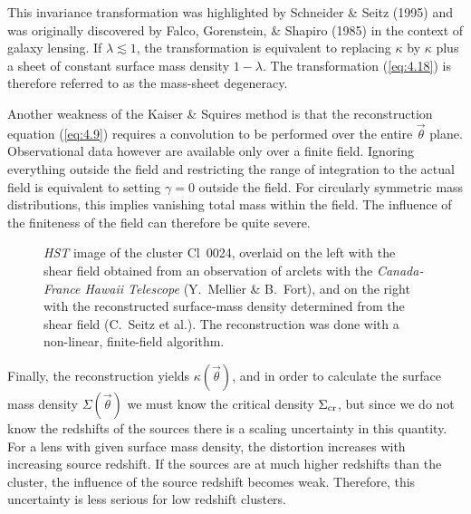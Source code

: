 \documentclass[a4paper,10pt]{article} %
\newcommand{\la}{\lesssim}
\begin{document}
This invariance transformation was highlighted by Schneider \& Seitz
(1995) and was originally discovered by Falco, Gorenstein, \& Shapiro
(1985) in the context of galaxy lensing. If $\lambda\la1$, the
transformation is equivalent to replacing $\kappa$ by $\kappa$ plus a
sheet of constant surface mass density $1-\lambda$. The transformation
(\ref{eq:4.18}) is therefore referred to as the mass-sheet degeneracy.

Another weakness of the Kaiser \& Squires method is that the
reconstruction equation (\ref{eq:4.9}) requires a convolution to be
performed over the entire $\vec\theta$ plane. Observational data
however are available only over a finite field. Ignoring everything
outside the field and restricting the range of integration to the
actual field is equivalent to setting $\gamma=0$ outside the
field. For circularly symmetric mass distributions, this implies
vanishing total mass within the field. The influence of the finiteness
of the field can therefore be quite severe.

\begin{figure}[ht] %
\begin{center}
\begin{minipage}[t]{0.45\hsize}
\end{minipage}
\begin{minipage}[t]{0.45\hsize}
\end{minipage}
\end{center}
\caption{{\em HST\/} image of the cluster Cl~0024, overlaid on the
  left with the shear field obtained from an observation of arclets
  with the {\em Canada-France Hawaii Telescope\/} (Y.\ Mellier \& B.\
  Fort), and on the right with the reconstructed surface-mass density
  determined from the shear field (C.\ Seitz et al.). The
  reconstruction was done with a non-linear, finite-field algorithm.}
\label{NB:fig4.3}
\end{figure}

Finally, the reconstruction yields $\kappa(\vec\theta)$, and in order
to calculate the surface mass density $\Sigma(\vec\theta)$ we must
know the critical density $\Sigma_{\rm cr}$, but since we do not know
the redshifts of the sources there is a scaling uncertainty in this
quantity. For a lens with given surface mass density, the distortion
increases with increasing source redshift. If the sources are at much
higher redshifts than the cluster, the influence of the source
redshift becomes weak. Therefore, this uncertainty is less serious for
low redshift clusters.
\end{document}
